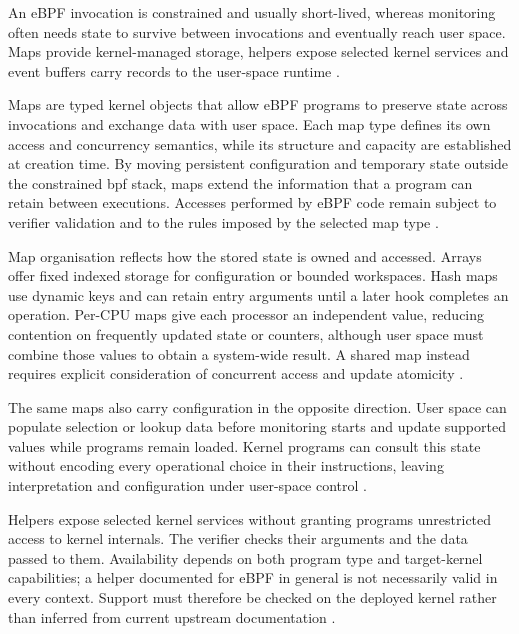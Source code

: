 An eBPF invocation is constrained and usually short-lived, whereas monitoring
often needs state to survive between invocations and eventually reach user
space. Maps provide kernel-managed storage, helpers expose selected kernel
services and event buffers carry records to the user-space runtime
\cite{linux_bpf_maps,linux_bpf_helpers,linux_perf_ring_buffer,
linux_bpf_ringbuf}.

Maps are typed kernel objects that allow eBPF programs to preserve state across
invocations and exchange data with user space. Each map type defines its own
access and concurrency semantics, while its structure and capacity are
established at creation time. By moving persistent configuration and temporary
state outside the constrained \gls{bpf} stack, maps extend the information that a
program can retain between executions. Accesses performed by eBPF code remain
subject to verifier validation and to the rules imposed by the selected map
type \cite{linux_bpf_maps,linux_bpf_syscall}.

Map organisation reflects how the stored state is owned and accessed. Arrays
offer fixed indexed storage for configuration or bounded workspaces. Hash maps
use dynamic keys and can retain entry arguments until a later hook completes
an operation. Per-CPU maps give each processor an independent value, reducing
contention on frequently updated state or counters, although user space must
combine those values to obtain a system-wide result. A shared map instead
requires explicit consideration of concurrent access and update atomicity
\cite{linux_bpf_maps}.

The same maps also carry configuration in the opposite direction. User space
can populate selection or lookup data before monitoring starts and update
supported values while programs remain loaded. Kernel programs can consult
this state without encoding every operational choice in their instructions,
leaving interpretation and configuration under user-space control
\cite{linux_bpf_maps,linux_bpf_syscall}.

Helpers expose selected kernel services without granting programs unrestricted
access to kernel internals. The verifier checks their arguments and the data
passed to them. Availability depends on both program type and target-kernel
capabilities; a helper documented for eBPF in general is not necessarily valid
in every context. Support must therefore be checked on the deployed kernel
rather than inferred from current upstream documentation
\cite{linux_bpf_helpers,linux2026ebpfverifier}.

